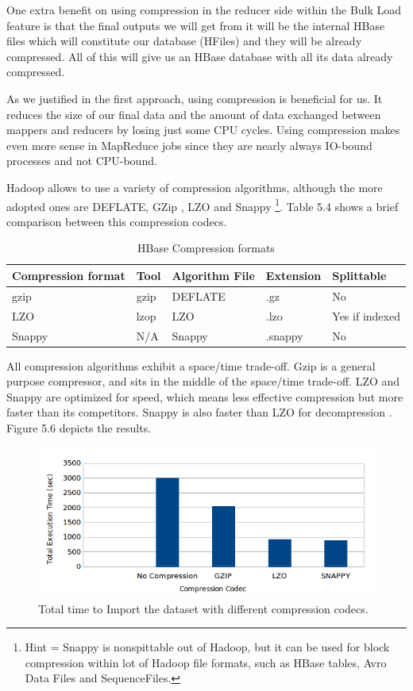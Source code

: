 One extra benefit on using compression in the reducer side within the Bulk Load feature is that the final outputs we will get from it will be the internal HBase files which will constitute our database (HFiles) and they will be already compressed. All of this will give us an HBase database with all its data already compressed.
\par
As we justified in the first approach, using compression is beneficial for us. It reduces the size of our final data and the amount of data exchanged between mappers and reducers by losing just some CPU cycles. Using compression makes even more sense in MapReduce jobs since they are nearly always IO-bound processes and not CPU-bound.
\bigskip
\par
Hadoop allows to use a variety of compression algorithms, although the more adopted ones are DEFLATE, GZip \cite{GZip}, LZO \cite{oberhumer2005lzo} and Snappy \cite{Snappy} \footnote{Hint = Snappy is nonspittable out of Hadoop, but it can be used for block compression within lot of Hadoop file formats, such as HBase tables, Avro Data Files and SequenceFiles.}. Table 5.4 shows a brief comparison between this compression codecs.
\begin{table}[htbp]

\begin{tabular}{|l|l|l|l|l|}
\hline
Compression format  & Tool  & Algorithm File  & Extension  & Splittable \\ \hline
gzip &  gzip  & DEFLATE  & .gz &  No \\ \hline
LZO &  lzop &  LZO  & .lzo &  Yes if indexed \\ \hline
Snappy  & N/A  & Snappy  & .snappy  & No \\ \hline
\end{tabular}
\label{}
\caption{HBase Compression formats}
\end{table}


All compression algorithms exhibit a space/time trade-off. Gzip is a general purpose compressor, and sits in the middle of the space/time trade-off. LZO and Snappy are optimized for speed, which means less effective compression but more faster than its competitors. Snappy is also faster than LZO for decompression \cite{CompressionHadoop}. Figure 5.6 depicts the results.


\begin{figure}[htb]
\centering
\includegraphics[width=1\textwidth]{./images/codecs1.png}
\caption{Total time to Import the dataset with different compression codecs.} \label{fig:codecs}
\end{figure}


